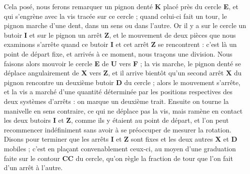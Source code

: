\documentclass[a4paper, 12pt]{article} %
\begin{document}
Cela posé, nous ferons remarquer un pignon denté \textbf{K} placé près du cercle \textbf{E}, et qui s'engrène avec la vis tracée sur ce cercle ; quand celui-ci fait un tour, le pignon marche d'une dent, dans un sens ou dans l'autre. Or il y a sur le cercle un butoir \textbf{I} et sur le pignon un arrêt \textbf{Z}, et le mouvement de deux pièces que nous examinons s'arrête quand ce butoir \textbf{I} et cet arrêt \textbf{Z} se rencontrent : c'est là un point de départ fixe, et arrivés à ce moment, nous traçons une division. Nous faisons alors mouvoir le cercle \textbf{E} de \textbf{U} vers \textbf{F} ; la vis marche, le pignon denté se déplace angulairement de \textbf{X} vers \textbf{Z}, et il arrive bientôt qu'un second arrêt \textbf{X} du pignon rencontre un deuxième butoir \textbf{D} du cercle ; alors le mouvement s'arrête, et la vis a marché d'une quantité déterminée par les positions respectives des deux systèmes d'arrêts : on marque un deuxième trait. Ensuite on tourne la manivelle en sens contraire, ce qui ne déplace pas la vis, mais ramène en contact les deux butoirs \textbf{I} et \textbf{Z}, comme ils y étaient au point de départ, et l'on peut recommencer indéfiniment sans avoir à se préoccuper de mesurer la rotation. Disons pour terminer que les arrêts \textbf{I} et \textbf{Z} sont fixes et les deux autres \textbf{X} et \textbf{D} mobiles ; c'est en plaçant convenablement ceux-ci, au moyen d'une graduation faite sur le contour \textbf{CC} du cercle, qu'on règle la fraction de tour que l'on fait d'un arrêt à l'autre.
\end{document}
